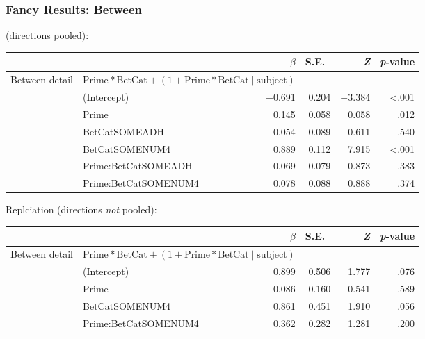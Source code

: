 \documentclass[noamssymb]{beamer}
\begin{document}
\begin{frame}

  \frametitle{{\ftf Fancy Results: Between}}
  \citeauthor{Bott:2016aa} (directions pooled):
  \begin{adjustbox}{width=1\textwidth,center=\textwidth}
    \begin{tabular}{llrrrr}
      \hline
      & & \(\beta\) & S.E.\ & \emph{Z} & \emph{p}-value  \\
      \hline
      Between detail & \multicolumn{2}{l}{\(\text{Prime} * \text{BetCat} + (1 + \text{Prime} * \text{BetCat} \mid \text{subject})\)}  & & & \\
      & (Intercept)  & \(-\)0.691 & 0.204 & \(-\)3.384 & <.001\\
      & Prime & 0.145 & 0.058 & 0.058 & .012 \\
      & BetCatSOMEADH & \(-\)0.054 & 0.089 & \(-\)0.611 & .540 \\
      & BetCatSOMENUM4 & 0.889 & 0.112 & 7.915 & <.001 \\
      & Prime:BetCatSOMEADH & \(-\)0.069 & 0.079 & \(-\)0.873 & .383 \\
      & Prime:BetCatSOMENUM4 & 0.078 & 0.088 & 0.888 & .374 \\
      \hline
    \end{tabular}
  \end{adjustbox}

  Replciation (directions \emph{not} pooled):
\begin{adjustbox}{width=1\textwidth,center=\textwidth}
    \begin{tabular}{llrrrr}
      \hline
      & & \(\beta\) & S.E.\ & \emph{Z} & \emph{p}-value  \\
      \hline
      Between detail & \multicolumn{2}{l}{\(\text{Prime} * \text{BetCat} + (1 + \text{Prime} * \text{BetCat} \mid \text{subject})\)}  & & & \\
      & (Intercept)  &  0.899 & 0.506 &  1.777 & .076 \\
      & Prime        & \(-\)0.086 & 0.160 & \(-\)0.541 & .589 \\
      & BetCatSOMENUM4 & 0.861  & 0.451 &  1.910 & .056 \\
      & Prime:BetCatSOMENUM4 &  0.362 & 0.282 &  1.281 & .200 \\
      \hline
    \end{tabular}
  \end{adjustbox}

\end{frame}
\end{document}
